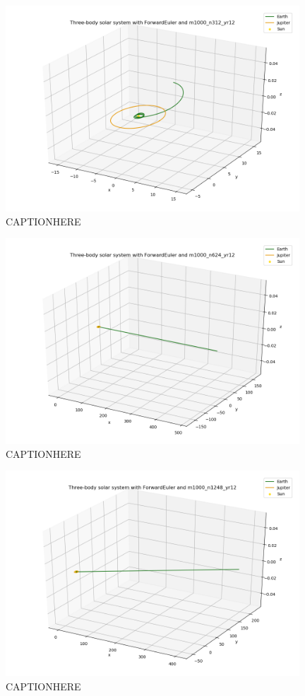 \documentclass{article}
\begin{document}
    \begin{figure}[H]
        \centering
        \includegraphics[width = 11cm]{img/plot3D_S_E_J_F_m1000_n312_yr12.png}
        \caption{CAPTIONHERE}
        \label{fig:plot3D_S_E_J_F_m1000_n312_yr12}
    \end{figure}

    \begin{figure}[H]
        \centering
        \includegraphics[width = 11cm]{img/plot3D_S_E_J_F_m1000_n624_yr12.png}
        \caption{CAPTIONHERE}
        \label{fig:plot3D_S_E_J_F_m1000_n624_yr12}
    \end{figure}

    \begin{figure}[H]
        \centering
        \includegraphics[width = 11cm]{img/plot3D_S_E_J_F_m1000_n1248_yr12.png}
        \caption{CAPTIONHERE}
        \label{fig:plot3D_S_E_J_F_m1000_n1248_yr12}
    \end{figure}
\end{document}
